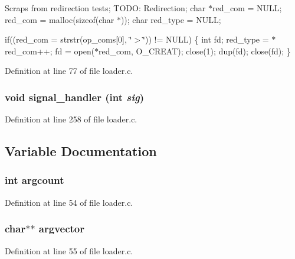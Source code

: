 Scraps from redirection tests; TODO: Redirection; char $\ast$red\_\-com = NULL; red\_\-com = malloc(sizeof(char $\ast$)); char red\_\-type = NULL;

if((red\_\-com = strstr(op\_\-coms[0], \char`\"{}$>$\char`\"{})) != NULL) \{ int fd; red\_\-type = $\ast$red\_\-com++; fd = open($\ast$red\_\-com, O\_\-CREAT); close(1); dup(fd); close(fd); \}



Definition at line 77 of file loader.c.

\subsubsection[{signal\_\-handler}]{\setlength{\rightskip}{0pt plus 5cm}void signal\_\-handler (int {\em sig})}\label{loader_8c_a8804db44b6d4c5752e6de5593562df06}


Definition at line 258 of file loader.c.



\subsection{Variable Documentation}
\subsubsection[{argcount}]{\setlength{\rightskip}{0pt plus 5cm}int {\bf argcount}}\label{loader_8c_aa9b31412bfe39a83843926c486082edf}


Definition at line 54 of file loader.c.

\subsubsection[{argvector}]{\setlength{\rightskip}{0pt plus 5cm}char$\ast$$\ast$ {\bf argvector}}\label{loader_8c_a48e7690ee5846e40a87963df06a87572}


Definition at line 55 of file loader.c.

